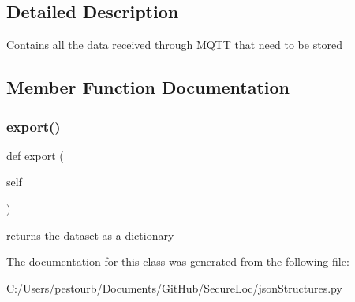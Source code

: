 \subsection{Detailed Description}
\begin{DoxyVerb}Contains all the data received through MQTT that need to be stored\end{DoxyVerb}
 

\subsection{Member Function Documentation}
\mbox{\label{classjson_structures_1_1dataset_a68cc2498d25cf6670863c141957ac262}} 
\subsubsection{\texorpdfstring{export()}{export()}}
{\footnotesize\ttfamily def export (\begin{DoxyParamCaption}\item[{}]{self }\end{DoxyParamCaption})}

\begin{DoxyVerb}returns the dataset as a dictionary\end{DoxyVerb}
 

The documentation for this class was generated from the following file\+:\begin{DoxyCompactItemize}
\item 
C\+:/\+Users/pestourb/\+Documents/\+Git\+Hub/\+Secure\+Loc/json\+Structures.\+py\end{DoxyCompactItemize}
